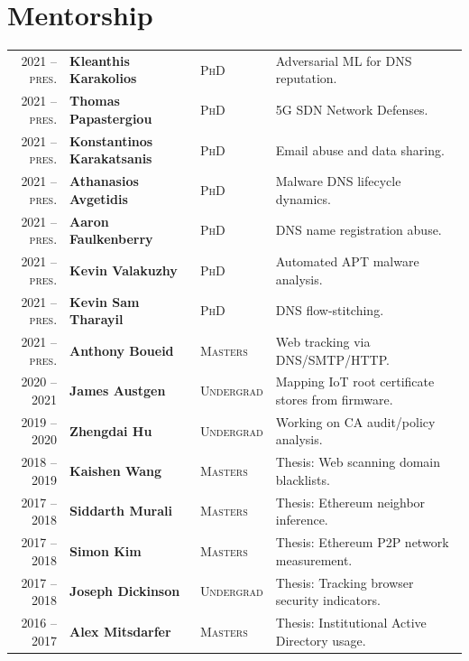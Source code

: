 \documentclass[10pt,singlecolumn]{article} %
\begin{document}
\newpage
\section{Mentorship} 
\begin{tabular}{rlll}
2021 -- \textsc{pres.} & \textbf{Kleanthis Karakolios} & \textsc{PhD} & Adversarial ML for DNS reputation.\\ 
2021 -- \textsc{pres.} & \textbf{Thomas Papastergiou} & \textsc{PhD} & 5G SDN Network Defenses.\\ 
2021 -- \textsc{pres.} & \textbf{Konstantinos Karakatsanis} & \textsc{PhD} & Email abuse and data sharing.\\ 
2021 -- \textsc{pres.} & \textbf{Athanasios Avgetidis} & \textsc{PhD} & Malware DNS lifecycle dynamics.\\ 
2021 -- \textsc{pres.} & \textbf{Aaron Faulkenberry} & \textsc{PhD} & DNS name registration abuse.\\ 
2021 -- \textsc{pres.} & \textbf{Kevin Valakuzhy} & \textsc{PhD} & Automated APT malware analysis.\\ 
2021 -- \textsc{pres.} & \textbf{Kevin Sam Tharayil} & \textsc{PhD} & DNS flow-stitching.\\ 
2021 -- \textsc{pres.} & \textbf{Anthony Boueid} & \textsc{Masters} & Web tracking via DNS/SMTP/HTTP.\\ 
2020 -- 2021             & \textbf{James Austgen} & \textsc{Undergrad} & Mapping IoT root certificate stores from firmware.\\ 
2019 -- 2020	         & \textbf{Zhengdai Hu} & \textsc{Undergrad} & Working on CA audit/policy analysis.\\ 
2018 -- 2019	         & \textbf{Kaishen Wang} & \textsc{Masters} & Thesis: Web scanning domain blacklists.\\
2017 -- 2018	         & \textbf{Siddarth Murali} & \textsc{Masters} & Thesis: Ethereum neighbor inference.\\ 
2017 -- 2018	         & \textbf{Simon Kim} & \textsc{Masters} & Thesis: Ethereum P2P network measurement.\\  
2017 -- 2018	         & \textbf{Joseph Dickinson} & \textsc{Undergrad} & Thesis: Tracking browser security indicators.\\  
2016 -- 2017	         & \textbf{Alex Mitsdarfer} & \textsc{Masters} & Thesis: Institutional Active Directory usage.\\ 
\end{tabular}\\[10pt]
\end{document}
